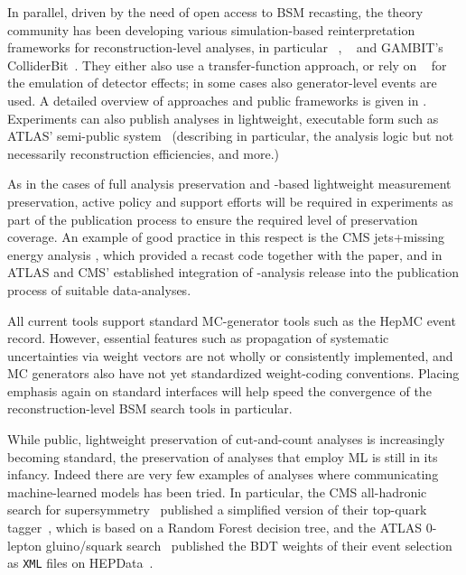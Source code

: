 \documentclass[11pt]{article}
\begin{document}
In parallel, driven by the need of open access to \gls{BSM} recasting, the theory community has been developing various simulation-based reinterpretation frameworks for reconstruction-level analyses, in particular \checkmate~\cite{Drees:2013wra,Dercks:2016npn}, \madanalysis~\cite{Dumont:2014tja,Conte:2018vmg} and GAMBIT's ColliderBit~\cite{GAMBIT:2017qxg}. They either also use a transfer-function approach, or rely on \delphes~\cite{deFavereau:2013fsa} for the emulation of detector effects; in some cases also generator-level events are used. A detailed overview of approaches and public frameworks is given in \cite{LHCReinterpretationForum:2020xtr}.
%
Experiments can also publish analyses in lightweight, executable form such as \gls{ATLAS}' semi-public \simpleanalysis system~\cite{atlas:simpleanalysis} 
(describing in particular, the analysis logic but not necessarily reconstruction efficiencies, and more.)

As in the cases of full analysis preservation and \rivet-based lightweight measurement preservation, active policy and support efforts will be required in experiments as part of the publication process to ensure the required level of preservation coverage. An example of good practice in this respect is the \gls{CMS} jets+missing energy analysis \cite{CMS:2021far}, which provided a \madanalysis recast code \cite{Albert:2774586,DVN/IRF7ZL_2021} together with the paper, and in \gls{ATLAS} and \gls{CMS}' established integration of \rivet-analysis release into the publication process of suitable data-analyses.

All current tools support standard MC-generator tools such as the HepMC event record. However, essential features such as propagation of systematic uncertainties via weight vectors are not wholly or consistently implemented, and MC generators also have not yet standardized weight-coding conventions. Placing emphasis again on standard interfaces will help speed the convergence of the reconstruction-level \gls{BSM} search tools in particular.

While public, lightweight preservation of cut-and-count analyses is increasingly becoming standard, the preservation of analyses that employ \gls{ML} is still in its infancy. 
Indeed there are very few examples of analyses where communicating machine-learned models has been tried. In particular, the \gls{CMS} all-hadronic search for supersymmetry~\cite{CMS:2017qxu} published a simplified version of their top-quark tagger~\cite{cms:toptagger}, which is based on a Random Forest decision tree, and the \gls{ATLAS} 0-lepton gluino/squark search~\cite{ATLAS:2020syg,Uno:2763449} published the \gls{BDT} weights of their event selection as \texttt{XML} files on HEPData~\cite{hepdata.95664.v2/r8}.  
\end{document}

